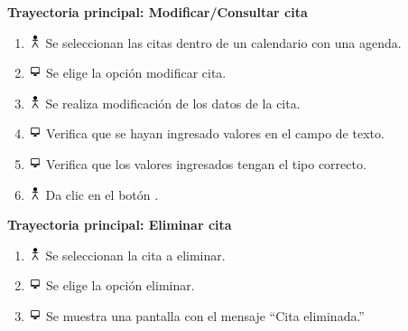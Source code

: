 \textbf{Trayectoria principal: Modificar/Consultar cita}        
\begin{enumerate}
\item \includegraphics[height=1em]{pictures/actor.png} Se seleccionan las citas dentro de un calendario con una agenda.
\item \includegraphics[height=1em]{pictures/sistema.png} Se elige la opción modificar cita.
\item \includegraphics[height=1em]{pictures/actor.png} Se realiza modificación de los datos de la cita.
\item \includegraphics[height=1em]{pictures/sistema.png} Verifica que se hayan ingresado valores en el campo de texto.
\item \includegraphics[height=1em]{pictures/sistema.png} Verifica que los valores ingresados tengan el tipo correcto.
\item \includegraphics[height=1em]{pictures/actor.png} Da clic en el botón .
\end{enumerate} \bigskip

\textbf{Trayectoria principal: Eliminar cita}        
\begin{enumerate}
\item \includegraphics[height=1em]{pictures/actor.png} Se seleccionan la cita a eliminar.
\item \includegraphics[height=1em]{pictures/sistema.png} Se elige la opción eliminar.
\item \includegraphics[height=1em]{pictures/sistema.png} Se muestra una pantalla con el mensaje ``Cita eliminada.''
\end{enumerate} \bigskip


